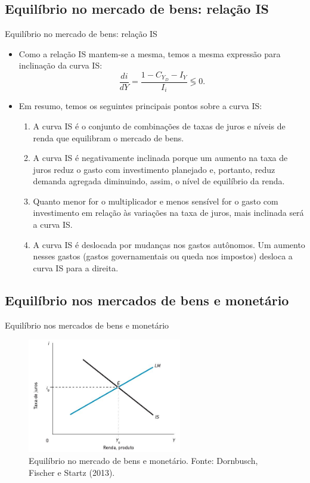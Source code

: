 \documentclass[10pt]{beamer}
\begin{document}
\subsection{Equilíbrio no mercado de bens: relação IS}
\begin{frame}{Equilíbrio no mercado de bens: relação IS}
    \begin{itemize}
        \item Como a relação IS mantem-se a mesma, temos a mesma expressão para inclinação da curva IS:
        \begin{equation}
            \frac{di}{dY} = \frac{1-C_{Y_D}-I_Y}{I_i} \lessgtr 0.
        \end{equation}
        \bigskip
        \item Em resumo, temos os seguintes principais pontos sobre a curva IS:
        \bigskip
        \begin{enumerate}
            \item A curva IS é o conjunto de combinações de taxas de juros e níveis de renda que equilibram o mercado de bens.
            \bigskip
            \item A curva IS é negativamente inclinada porque um aumento na taxa de juros reduz o gasto com investimento planejado e, portanto, reduz demanda agregada diminuindo, assim, o nível de equilíbrio da renda.
            \bigskip
            \item Quanto menor for o multiplicador e menos sensível for o gasto com investimento em relação às variações na taxa de juros, mais inclinada será a curva IS.
            \bigskip
            \item A curva IS é deslocada por mudanças nos gastos autônomos. Um aumento nesses gastos (gastos governamentais ou queda nos impostos) desloca a curva IS para a direita.
        \end{enumerate}
    \end{itemize}
\end{frame}

\subsection{Equilíbrio nos mercados de bens e monetário}
\begin{frame}{Equilíbrio nos mercados de bens e monetário}
    \begin{figure}
        \centering
        \includegraphics[width=0.6\textwidth]{./figures/aula092_fig8.JPG}
        \caption{Equilíbrio no mercado de bens e monetário. Fonte: Dornbusch, Fischer e Startz (2013).}
        \label{fig8}
    \end{figure}
\end{frame}
\end{document}
